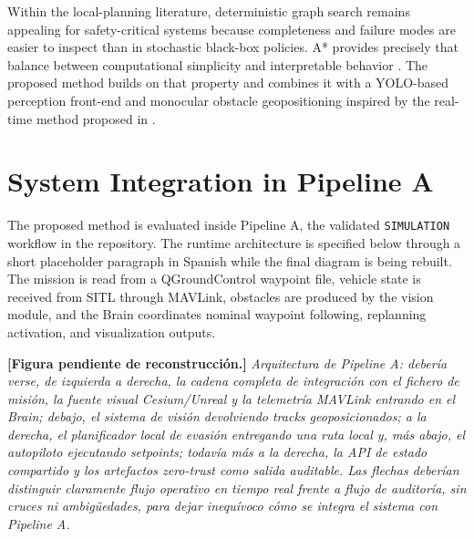 \documentclass[a4paper,11pt]{article}
\newcommand{\diagramplaceholder}[1]{\par\smallskip\noindent\textbf{[Figura pendiente de reconstrucción.] } \emph{#1}\par\smallskip}
\begin{document}
Within the local-planning literature, deterministic graph search remains appealing for safety-critical systems because completeness and failure modes are easier to inspect than in stochastic black-box policies. A* provides precisely that balance between computational simplicity and interpretable behavior \cite{hart1968formal}. The proposed method builds on that property and combines it with a YOLO-based perception front-end \cite{ultralytics_yolo} and monocular obstacle geopositioning inspired by the real-time method proposed in \cite{alaez2023real}.

\section{System Integration in Pipeline A}

The proposed method is evaluated inside Pipeline A, the validated \texttt{SIMULATION} workflow in the repository. The runtime architecture is specified below through a short placeholder paragraph in Spanish while the final diagram is being rebuilt. The mission is read from a QGroundControl waypoint file, vehicle state is received from SITL through MAVLink, obstacles are produced by the vision module, and the Brain coordinates nominal waypoint following, replanning activation, and visualization outputs.

\diagramplaceholder{Arquitectura de Pipeline A: debería verse, de izquierda a derecha, la cadena completa de integración con el fichero de misión, la fuente visual Cesium/Unreal y la telemetría MAVLink entrando en el Brain; debajo, el sistema de visión devolviendo tracks geoposicionados; a la derecha, el planificador local de evasión entregando una ruta local y, más abajo, el autopiloto ejecutando setpoints; todavía más a la derecha, la API de estado compartido y los artefactos zero-trust como salida auditable. Las flechas deberían distinguir claramente flujo operativo en tiempo real frente a flujo de auditoría, sin cruces ni ambigüedades, para dejar inequívoco cómo se integra el sistema con Pipeline A.}
\end{document}
